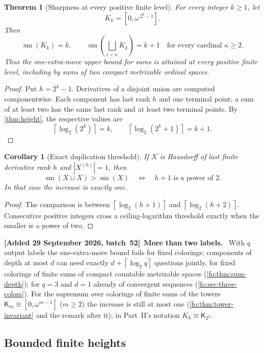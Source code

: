 \documentclass[11pt,letterpaper]{article}
\numberwithin{equation}{section}
\newtheorem{theorem}{Theorem}[section]
\newtheorem{corollary}[corollary]{Corollary}
\theoremstyle{definition}
\theoremstyle{remark}
\theoremstyle{definition}
\newcommand{\sm}{\operatorname{sm}}
\newcommand{\ceil}[1]{\left\lceil#1\right\rceil}
\newcommand{\bigsqsum}{\bigsqcup}
\newcommand{\Tw}{\mathsf K}
\newenvironment{writenote}[1][]{\par\smallskip\begingroup\small\sloppy
 \noindent\textbf{[Added 29 September 2026, batch~52]}\if\relax\detokenize{#1}\relax\else~\textbf{#1.}\fi\ }%
 {\par\endgroup\smallskip}
\begin{document}
\begin{theorem}[Sharpness at every positive finite level]\label{thm:sharp}
For every integer $k\geq1$, let
\[
 K_k=[0,\omega^{\,2^k-1}].
\]
Then
\begin{equation}\label{eq:sharp}
 \sm(K_k)=k,\qquad
 \sm\!\left(\bigsqsum_{i<\kappa}K_k\right)=k+1
 \quad\text{for every cardinal }\kappa\geq2.
\end{equation}
Thus the one-extra-move upper bound for sums is attained at every positive
finite level, including by sums of two compact metrizable ordinal spaces.
\end{theorem}
\begin{proof}
Put $h=2^k-1$. Derivatives of a disjoint union are computed componentwise.
Each component has last rank $h$ and one terminal point; a sum of at least two
has the same last rank and at least two terminal points. By
\cref{thm:height}, the respective values are
\[
 \ceil{\log_2(2^k)}=k,\qquad
 \ceil{\log_2(2^k+1)}=k+1.
\]
\end{proof}

\begin{corollary}[Exact duplication threshold]\label{cor:threshold}
If $X$ is Hausdorff of last finite derivative rank $h$ and
$|X^{(h)}|=1$, then
\[
 \sm(X\sqcup X)>
 \sm(X)
 \quad\Longleftrightarrow\quad h+1\text{ is a power of }2.
\]
In that case the increase is exactly one.
\end{corollary}
\begin{proof}
The comparison is between $\ceil{\log_2(h+1)}$ and
$\ceil{\log_2(h+2)}$. Consecutive positive integers cross a ceiling-logarithm
threshold exactly when the smaller is a power of two.
\end{proof}

\begin{writenote}[More than two labels]
With $q$ output labels the one-extra-move bound fails for fixed colorings:
components of depth at most $d$ can need exactly $d+\ceil{\log_2q}$ questions
jointly, for fixed colorings of finite sums of compact countable metrizable
spaces (\cref{fo:thm:sum-depth}); for $q=3$ and $d=1$ already of convergent
sequences (\cref{fo:sec:three-colors}). For the supremum over colorings of
finite sums of the towers $\Tw_m\cong[0,\omega^{m-1}]$ ($m\ge2$) the
increase is still at most one (\cref{fo:thm:tower-invariant} and the remark
after it); in Part~II's notation $K_k\cong\Tw_{2^k}$.
\end{writenote}

\subsection{Bounded finite heights}
\end{document}
